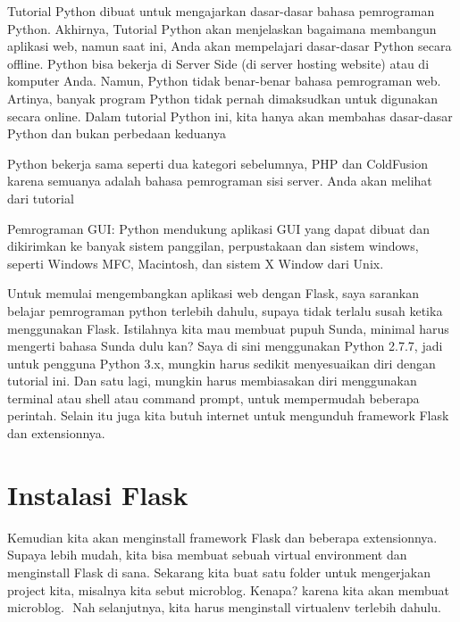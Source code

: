 {{{\vspace{14pt}
\noindent 
{\fontsize{14pt}{14pt}\selectfont Tutorial Python dibuat untuk mengajarkan dasar-dasar bahasa pemrograman Python. Akhirnya, Tutorial Python akan menjelaskan bagaimana membangun aplikasi web, namun saat ini, Anda akan mempelajari dasar-dasar Python secara offline. Python bisa bekerja di Server Side (di server hosting website) atau di komputer Anda. Namun, Python tidak benar-benar bahasa pemrograman web. Artinya, banyak program Python tidak pernah dimaksudkan untuk digunakan secara online. Dalam tutorial Python ini, kita hanya akan membahas dasar-dasar Python dan bukan perbedaan keduanya \\} \par
\vspace{14pt}
\noindent 
{\fontsize{14pt}{14pt}\selectfont Python bekerja sama seperti dua kategori sebelumnya, PHP dan ColdFusion karena semuanya adalah bahasa pemrograman sisi server. Anda akan melihat dari tutorial \\} \par
\noindent 
{\fontsize{14pt}{14pt}\selectfont Pemrograman GUI: Python mendukung aplikasi GUI yang dapat dibuat dan dikirimkan ke banyak sistem panggilan, perpustakaan dan sistem windows, seperti Windows MFC, Macintosh, dan sistem X Window dari Unix. \\} \par
\vspace{14pt}
\noindent 
{\fontsize{14pt}{14pt}\selectfont Untuk memulai mengembangkan aplikasi web dengan Flask, saya sarankan belajar pemrograman python terlebih dahulu, supaya tidak terlalu susah ketika menggunakan Flask. Istilahnya kita mau membuat pupuh Sunda, minimal harus mengerti bahasa Sunda dulu kan? Saya di sini menggunakan Python 2.7.7, jadi untuk pengguna Python 3.x, mungkin harus sedikit menyesuaikan diri dengan tutorial ini. Dan satu lagi, mungkin harus membiasakan diri menggunakan terminal atau shell atau command prompt, untuk mempermudah beberapa perintah. Selain itu juga kita butuh internet untuk mengunduh framework Flask dan extensionnya. \\} \par
\noindent 
{\fontsize{14pt}{14pt}\section {Instalasi Flask}
\noindent 
{\fontsize{14pt}{14pt}\selectfont Kemudian kita akan menginstall framework Flask dan beberapa extensionnya. Supaya lebih mudah, kita bisa membuat sebuah virtual environment dan menginstall Flask di sana. Sekarang kita buat satu folder untuk mengerjakan project kita, misalnya kita sebut microblog. Kenapa? karena kita akan membuat microblog. $  $ $  $Nah selanjutnya, kita harus menginstall virtualenv terlebih dahulu. \\} \par
}}}}
